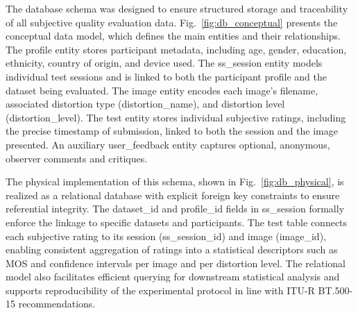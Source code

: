 The database schema was designed to ensure structured storage and traceability of all subjective quality evaluation data. Fig.~\ref{fig:db_conceptual} presents the conceptual data model, which defines the main entities and their relationships. The profile entity stores participant metadata, including age, gender, education, ethnicity, country of origin, and device used. The ss\_session entity models individual test sessions and is linked to both the participant profile and the dataset being evaluated. The image entity encodes each image's filename, associated distortion type (distortion\_name), and distortion level (distortion\_level). The test entity stores individual subjective ratings, including the precise timestamp of submission, linked to both the session and the image presented. An auxiliary user\_feedback entity captures optional, anonymous, observer comments and critiques.

The physical implementation of this schema, shown in Fig.~\ref{fig:db_physical}, is realized as a relational database with explicit foreign key constraints to ensure referential integrity. The dataset\_id and profile\_id fields in ss\_session formally enforce the linkage to specific datasets and participants. The test table connects each subjective rating to its session (ss\_session\_id) and image (image\_id), enabling consistent aggregation of ratings into a statistical descriptors such as MOS and confidence intervals per image and per distortion level. The relational model also facilitates efficient querying for downstream statistical analysis and supports reproducibility of the experimental protocol in line with ITU-R BT.500-15 recommendations.

